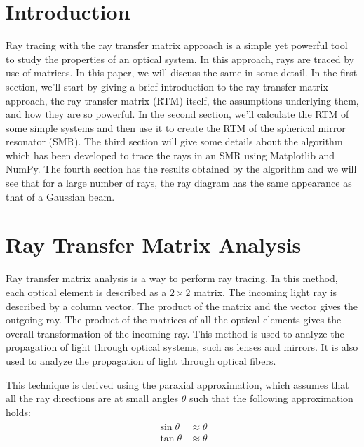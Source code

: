 \documentclass[12pt]{article}
\begin{document}
\section*{Introduction}
Ray tracing with the ray transfer matrix approach is a simple yet powerful tool to study the properties of an optical system. In this approach, rays are traced by use of matrices. In this paper, we will discuss the same in some detail. In the first section, we'll start by giving a brief introduction to the ray transfer matrix approach, the ray transfer matrix (RTM) itself, the assumptions underlying them, and how they are so powerful. In the second section, we'll calculate the RTM of some simple systems and then use it to create the RTM of the spherical mirror resonator (SMR). The third section will give some details about the algorithm which has been developed to trace the rays in an SMR using {\color{cyan}Matplotlib} and {\color{cyan}NumPy}. The fourth section has the results obtained by the algorithm and we will see that for a large number of rays, the ray diagram has the same appearance as that of a Gaussian beam.

\section{Ray Transfer Matrix Analysis}
Ray transfer matrix analysis is a way to perform ray tracing. In this method, each optical element is described as a \(2\times 2\) matrix. The incoming light ray is described by a column vector. The product of the matrix and the vector gives the outgoing ray. The product of the matrices of all the optical elements gives the overall transformation of the incoming ray. This method is used to analyze the propagation of light through optical systems, such as lenses and mirrors. It is also used to analyze the propagation of light through optical fibers.\cite{wikipedia}\cite{photonics}

This technique is derived using the paraxial approximation, which assumes that all the ray directions are at small angles \(\theta\) such that the following approximation holds:
\begin{align}
    \label{eq:paraxial}
    \begin{split}
        \sin \theta &\approx \theta \\
        \tan \theta &\approx \theta
    \end{split}
\end{align}
\end{document}
